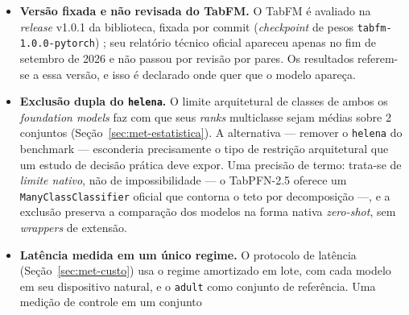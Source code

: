 \begin{itemize}
    sobreajuste da comunidade ao OpenML da qual nenhum benchmark público
    escapa. Para o TabFM, o relatório técnico declara pré-treino
    \emph{exclusivamente sintético} --- tabelas amostradas de modelos
    causais estruturais com dependências funcionais aleatorizadas
    \citep{kong2026} ---, o que exclui por construção a
    contaminação direta por conjuntos do OpenML (verificação na fonte
    primária em 05/10/2026) --- diferentemente, como visto, do
    \emph{checkpoint} padrão do classificador TabPFN. Permanece o risco mais fraco, que o desenho não
    consegue eliminar: \emph{priors} desenhados por equipes que conhecem os
    benchmarks públicos. Tratamos esse risco residual com três cuidados: ele é
    declarado aqui e retomado na interpretação dos resultados; as
    conclusões sobre \emph{foundation models} são enunciadas no nível de
    regime (consistência entre conjuntos), não de célula individual; e o
    eixo de custo --- imune a contaminação --- participa de toda conclusão
    prática.
  \item \textbf{Versão fixada e não revisada do TabFM.} O TabFM é avaliado
    na \emph{release} v1.0.1 da biblioteca, fixada por commit
    (\emph{checkpoint} de pesos \texttt{tabfm-1.0.0-pytorch})
    \citep{tabfm2026}; seu relatório
    técnico oficial \citep{kong2026} apareceu apenas no fim de setembro de
    2026 e não passou por revisão por pares. Os resultados referem-se a essa
    versão, e isso é declarado onde quer que o modelo apareça.
  \item \textbf{Exclusão dupla do \texttt{helena}.} O limite arquitetural de
    classes de ambos os \emph{foundation models} faz com que seus
    \emph{ranks} multiclasse sejam médias sobre 2 conjuntos
    (Seção~\ref{sec:met-estatistica}). A alternativa --- remover o
    \texttt{helena} do benchmark --- esconderia precisamente o tipo de
    restrição arquitetural que um estudo de decisão prática deve expor.
    Uma precisão de termo: trata-se de \emph{limite nativo}, não de
    impossibilidade --- o TabPFN-2.5 oferece um
    \texttt{ManyClassClassifier} oficial que contorna o teto por
    decomposição ---, e a exclusão preserva a comparação dos modelos
    na forma nativa \emph{zero-shot}, sem \emph{wrappers} de extensão.
  \item \textbf{Latência medida em um único regime.} O protocolo de
    latência (Seção~\ref{sec:met-custo}) usa o regime amortizado em lote,
    com cada modelo em seu dispositivo natural, e o \texttt{adult} como
    conjunto de referência. Uma medição de controle em um conjunto

\end{itemize}
